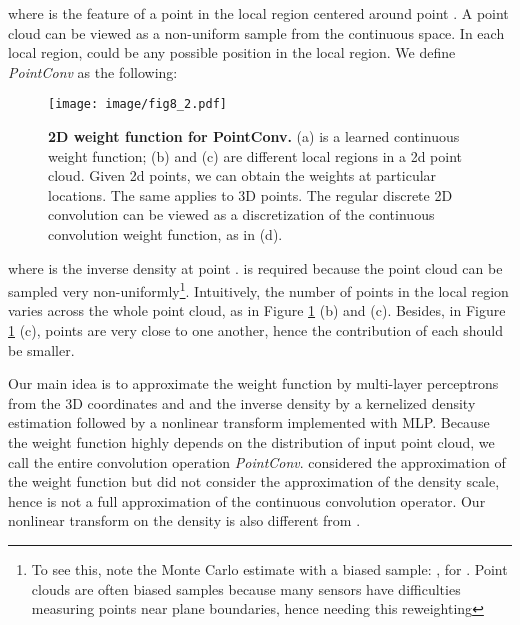 \documentclass[10pt,twocolumn,letterpaper]{article}
\begin{document}
\noindent where  is the feature of a point in the local region  centered around point . A point cloud can be viewed as a non-uniform sample from the continuous  space. In each local region,  could be any possible position in the local region. We define \textit{PointConv} as the following:
 
\vspace{-0.2in}
\begin{small}
    
\end{small}
\vskip -0.15in

\begin{figure}
	\centering
	\texttt{[image: image/fig8\_2.pdf]}
	\caption{\textbf{2D weight function for PointConv.} (a) is a learned continuous weight function; (b) and (c) are different local regions in a 2d point cloud. Given 2d points, we can obtain the weights at particular locations. The same applies to 3D points. The regular discrete 2D convolution can be viewed as a discretization of the continuous convolution weight function, as in (d).}
	\label{fig3}
\vspace{-0.15in}
\end{figure}

\noindent where  is the inverse density at point .  is required because the point cloud can be sampled very non-uniformly\footnote{To see this, note the Monte Carlo estimate with a biased sample: , for . Point clouds are often biased samples because many sensors have difficulties measuring points near plane boundaries, hence needing this reweighting}. Intuitively, the number of points in the local region varies across the whole point cloud, as in Figure \ref{fig3} (b) and (c). Besides, in Figure \ref{fig3} (c), points  are very close to one another, hence the contribution of each should be smaller. 

Our main idea is to approximate the weight function  by multi-layer perceptrons from the 3D coordinates  and and the inverse density  by a kernelized density estimation \cite{turlach1993bandwidth} followed by a nonlinear transform implemented with MLP. Because the weight function highly depends on the distribution of input point cloud, we call the entire convolution operation \textit{PointConv}. \cite{jia2016dynamic,simonovsky2017dynamic} considered the approximation of the weight function but did not consider the approximation of the density scale, hence is not a full approximation of the continuous convolution operator. Our nonlinear transform on the density is also different from \cite{hermosilla2018monte}.
\end{document}
